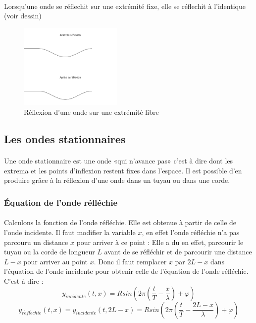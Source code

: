 \documentclass[a4paper]{article}
\begin{document}
\paragraph{}Lorsqu'une onde se réflechit sur une extrémité fixe, elle se réflechit à l'identique (voir dessin)
\begin{figure}
\begin{center}
\includegraphics[width=5cm]{imgs/refllibre.png}
\end{center}
\caption{Réflexion d'une onde sur une extrémité libre}
\label{Réflexion d'une onde sur une extrémité libre}
\end{figure}
\subsection{Les ondes stationnaires}
\paragraph{}Une onde stationnaire est une onde «qui n'avance pas» c'est à dire dont les extrema et les points d'inflexion restent fixes dans l'espace. Il est possible d'en produire grâce à la réflexion d'une onde dans un tuyau ou dans une corde.
\subsubsection{Équation de l'onde réfléchie}
\paragraph{}Calculons la fonction de l'onde réfléchie. Elle est obtenue à partir de celle de l'onde incidente. Il faut modifier la variable $x$, en effet l'onde réfléchie n'a pas parcouru un distance $x$ pour arriver à ce point : Elle a du en effet, parcourir le tuyau ou la corde de longueur $L$ avant de se réfléchir et de parcourir une distance $L-x$ pour arriver au point $x$. Donc il faut remplacer $x$ par $2L-x$ dans l'équation de l'onde incidente pour obtenir celle de l'équation de l'onde réfléchie. C'est-à-dire :  
\[y_{incidente}(t,x)=Rsin\left(2\pi \left(\frac{t}{T}-\frac{x}{\lambda}\right)+\varphi\right)\]
\[y_{r\acute{e}fl\acute{e}chie}(t,x)=y_{incidente}(t,2L-x)=Rsin\left(2\pi \left(\frac{t}{T}-\frac{2L-x}{\lambda}\right)+\varphi\right)\]
\end{document}
